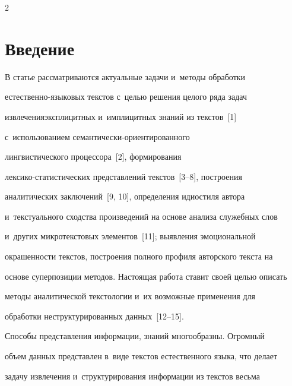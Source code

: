 \begin{multicols}{2}





\label{st\stat}


      


    \section{Введение}


    


    \vspace*{-5pt}


    


     В статье рассматриваются актуальные задачи и~методы обработки 


естественно-языковых текс\-тов с~целью решения целого ряда задач 


извлечения\linebreak эксплицитных и~имплицитных знаний из текс\-тов~[1] 


с~использованием се\-ман\-ти\-чески-ори\-ен\-ти\-ро\-ван\-но\-го 


лингвистического процессора~[2], формирования  


лек\-си\-ко-ста\-ти\-сти\-че\-ских представлений текстов~[3--8], построения 


аналитических заключений~[9, 10], определения идиостиля автора 


и~текстуального сходства произведений на основе анализа служебных слов 


и~других микротекстовых элементов~[11]; выявления эмоциональной 


окрашенности текстов, построения полного профиля авторского текста на 


основе суперпозиции методов. Настоящая работа ставит своей целью описать 


методы аналитической текстологии и~их возможные применения для 


обработки неструктурированных данных~[12--15]. 


     


     Способы представления информации, знаний многообразны. Огромный 


объем данных пред\-став\-лен в~виде текстов естественного языка, что делает 


задачу извлечения и~структурирования информации из текстов весьма 



\end{multicols}
